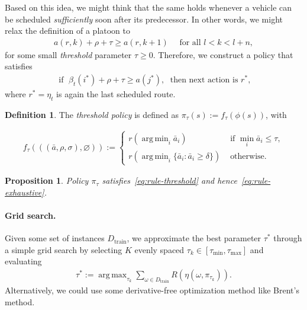 \documentclass[a4paper]{report}
\theoremstyle{definition}
\newtheorem{define}{Definition}[chapter]
\theoremstyle{plain}
\newtheorem{proposition}{Proposition}[chapter]
\DeclareMathOperator*{\argmax}{arg\,max}
\DeclareMathOperator*{\argmin}{arg\,min}
\begin{document}
Based on this idea, we might think that the same holds whenever a vehicle can be
scheduled \textit{sufficiently} soon after its predecessor.
%
In other words, we might relax the definition of a platoon to
\begin{align*}
  a(r,k) + \rho + \tau \geq a(r, k + 1) \quad \text{ for all } l < k < l + n,
\end{align*}
for some small \emph{threshold} parameter $\tau \geq 0$.
%
Therefore, we construct a policy that satisfies
\begin{align}\label{eq:rule-threshold}\tag{threshold}
  \text{ if } \; \beta_t(i^*) + \rho + \tau \geq a(j^*) , \; \text{ then next action is } r^* ,
\end{align}
where $r^* = \eta_t$ is again the last scheduled route.

\begin{define}
  The \emph{threshold policy} is defined as
  $\pi_\tau(s) := f_\tau(\phi(s))$, with
  
\begin{align}
  f_\tau(((\bar{a}, \rho, \sigma), \varnothing)) := \begin{cases}
    r(\argmin_i \bar{a}_i) & \text{ if } \min_i \bar{a}_i \leq \tau , \\
    r(\argmin_i \{ \bar{a}_i : \bar{a}_i \geq \delta \}) & \text{ otherwise. }
    \end{cases}
\end{align}
\end{define}

\begin{proposition}
  Policy $\pi_\tau$ satisfies~\eqref{eq:rule-threshold} and hence~\eqref{eq:rule-exhaustive}.
\end{proposition}

\paragraph{Grid search.}

Given some set of instances $D_\mathrm{train}$, we approximate the best
parameter $\tau^*$ through a simple grid search by selecting $K$ evenly spaced
$\tau_k \in [\tau_{\min}, \tau_{\max}]$ and evaluating
\begin{align*}
  \tau^* := \argmax_{\tau_k} \sum_{\omega \in D_\textrm{train}} R(\eta(\omega, \pi_{\tau_k})) .
\end{align*}
%
Alternatively, we could use some derivative-free optimization method like Brent's method.
\end{document}
